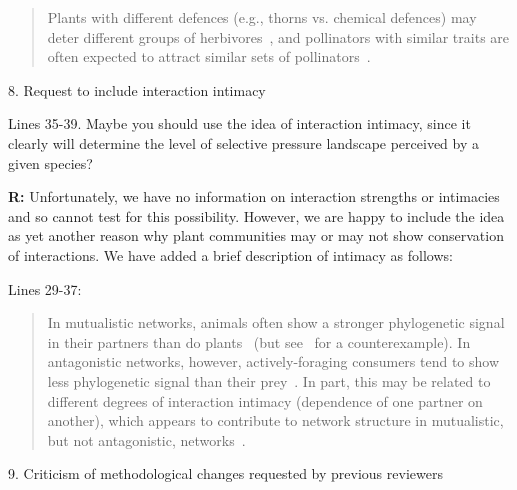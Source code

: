 \documentclass[12pt]{letter}
\newenvironment{refquote}{\bigskip \begin{it}}{\end{it}\smallskip}
\begin{document}
		\begin{quotation}

			Plants with different defences 
			(e.g., thorns vs. chemical defences) may deter different groups of 
			herbivores~\citep{Ehrlich1964,Johnson2014}, and pollinators with similar traits are often expected to attract similar sets of pollinators~\citep{Waser1996,Fenster2004,Ollerton2009}.

		\end{quotation}


	8. Request to include interaction intimacy

		\begin{refquote}
		Lines 35-39. Maybe you should use the idea of interaction intimacy, since it clearly will determine the level of selective pressure landscape perceived by a given species?
		\end{refquote}


		\textbf{R:} Unfortunately, we have no information on interaction strengths or intimacies and so cannot test for this possibility. However, we are happy to include the idea as yet another reason why plant communities may or may not show conservation of interactions. We have added a brief description of intimacy as follows:


		Lines 29-37:

		\begin{quotation}

			In mutualistic networks, animals often show a stronger phylogenetic signal in their partners than do plants~\citep{Rezende2007a,Chamberlain2014,Rohr2014,Vamosi2014,Lind2015,Fontaine2015} (but see~\citet{Rafferty2013} for a counterexample). In antagonistic networks, however, actively-foraging consumers tend to show less phylogenetic signal than their prey~\citep{Ives2006,Cagnolo2011,Naisbit2011,Fontaine2015}. In part, this may be related to different degrees of interaction intimacy (dependence of one partner on another), which appears to contribute to network structure in mutualistic, but not antagonistic, networks~\citep{Guimaraes2007,Ponisio2017}.

		\end{quotation}


	9. Criticism of methodological changes requested by previous reviewers
\end{document}
